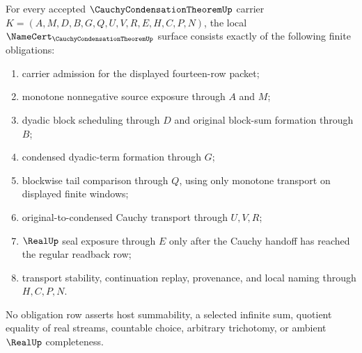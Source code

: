 \begin{theorem}
\label{thm:cauchy-condensation-theorem-namecert-obligations}
For every accepted $\CauchyCondensationTheoremUp$ carrier $K=(A,M,D,B,G,Q,U,V,R,E,H,C,P,N)$, the local $\NameCert_{\CauchyCondensationTheoremUp}$ surface consists exactly of the following finite obligations:
\begin{enumerate}
\item carrier admission for the displayed fourteen-row packet;
\item monotone nonnegative source exposure through $A$ and $M$;
\item dyadic block scheduling through $D$ and original block-sum formation through $B$;
\item condensed dyadic-term formation through $G$;
\item blockwise tail comparison through $Q$, using only monotone transport on displayed finite windows;
\item original-to-condensed Cauchy transport through $U,V,R$;
\item $\RealUp$ seal exposure through $E$ only after the Cauchy handoff has reached the regular readback row;
\item transport stability, continuation replay, provenance, and local naming through $H,C,P,N$.
\end{enumerate}
No obligation row asserts host summability, a selected infinite sum, quotient equality of real streams, countable choice, arbitrary trichotomy, or ambient $\RealUp$ completeness.
\end{theorem}
